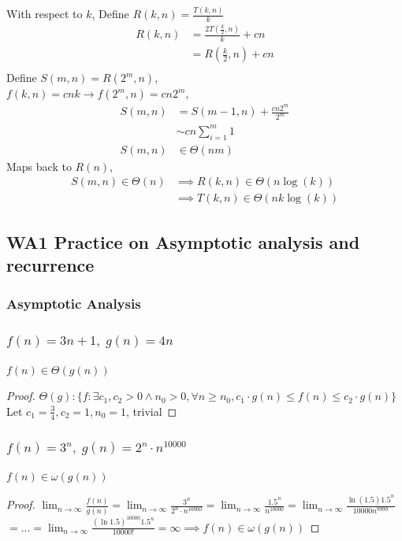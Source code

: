 \documentclass[9pt]{extarticle}
\begin{document}
With respect to $k$, Define $R(k, n) = \frac{T(k, n)}{k}$
\begin{align*}
    R(k, n) &= \frac{2 T(\frac{k}{2}, n)}{k} + cn\\
    &= R(\frac{k}{2}, n) + cn\\
\end{align*}
Define $S(m, n) = R(2^m, n)$,\\
$f(k, n) = cnk \rightarrow f(2^m, n) = cn2^m$, 
\begin{align*}
    S(m, n) &= S(m - 1, n) + \frac{cn2^m}{2^m}\\
    & \sim cn\sum_{i=1}^{m} 1\\
    S(m, n) &\in \Theta(nm)
\end{align*}
Maps back to $R(n)$,
\begin{align*}
    S(m, n) \in \Theta(n) &\implies R(k, n) \in \Theta(n\log(k))\\
    &\implies T(k, n) \in \Theta(nk\log(k))
\end{align*}

\subsection{WA1 Practice on Asymptotic analysis and recurrence}

\subsubsection*{Asymptotic Analysis}
\subsubsection{$f(n) = 3n + 1,\; g(n) = 4n$}
$f(n) \in \Theta(g(n))$
\begin{proof}
    $\Theta(g): \{f: \exists c_1, c_2 > 0 \land n_0 > 0, \forall n \geq n_0, c_1 \cdot g(n) \leq f(n) \leq c_2 \cdot g(n)\}$ \\

    Let $c_1 = \frac{3}{4}, c_2 = 1, n_0 = 1$, trivial
\end{proof}
\subsubsection{$f(n) = 3^n,\; g(n) = 2^n \cdot n^{10000}$}
$f(n) \in \omega(g(n))$
\begin{proof}
    $\lim_{n \rightarrow \infty} \frac{f(n)}{g(n)} = \lim_{n \rightarrow \infty}
     \frac{3^n}{2^n \cdot n^{10000}} = \lim_{n \rightarrow \infty} \frac{1.5^n}{n^{10000}} 
     = \lim_{n \rightarrow \infty} \frac{\ln(1.5)1.5^n}{10000n^{9999}}$\\
     $= ... = \lim_{n \rightarrow \infty} \frac{(\ln 1.5)^{10000}1.5^n}{10000!} = \infty \implies f(n) \in \omega(g(n))$
\end{proof}
\end{document}
